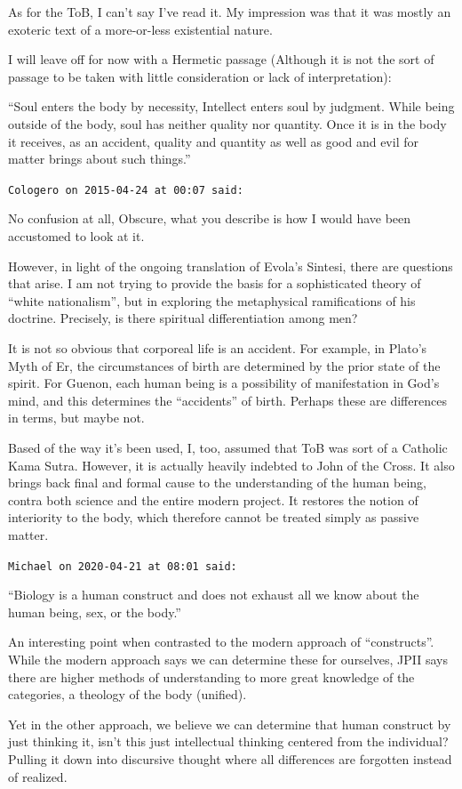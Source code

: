 \begin{footnotesize}
\begin{sffamily}
As for the ToB, I can't say I've read it. My impression was that it was mostly an exoteric text of a more-or-less existential nature.

I will leave off for now with a Hermetic passage (Although it is not the sort of passage to be taken with little consideration or lack of interpretation):

``Soul enters the body by necessity, Intellect enters soul by judgment. While being outside of the body, soul has neither quality nor quantity. Once it is in the body it receives, as an accident, quality and quantity as well as good and evil for matter brings about such things.''

\hfill

\texttt{Cologero on 2015-04-24 at 00:07 said:}

No confusion at all, Obscure, what you describe is how I would have been accustomed to look at it.

However, in light of the ongoing translation of Evola's Sintesi, there are questions that arise. I am not trying to provide the basis for a sophisticated theory of ``white nationalism'', but in exploring the metaphysical ramifications of his doctrine. Precisely, is there spiritual differentiation among men?

It is not so obvious that corporeal life is an accident. For example, in Plato's Myth of Er, the circumstances of birth are determined by the prior state of the spirit. For Guenon, each human being is a possibility of manifestation in God's mind, and this determines the ``accidents'' of birth. Perhaps these are differences in terms, but maybe not.

Based of the way it's been used, I, too, assumed that ToB was sort of a Catholic Kama Sutra. However, it is actually heavily indebted to John of the Cross. It also brings back final and formal cause to the understanding of the human being, contra both science and the entire modern project. It restores the notion of interiority to the body, which therefore cannot be treated simply as passive matter.

\hfill

\texttt{Michael on 2020-04-21 at 08:01 said:}

``Biology is a human construct and does not exhaust all we know about the human being, sex, or the body.''

An interesting point when contrasted to the modern approach of ``constructs''. While the modern approach says we can determine these for ourselves, JPII says there are higher methods of understanding to more great knowledge of the categories, a theology of the body (unified).

Yet in the other approach, we believe we can determine that human construct by just thinking it, isn't this just intellectual thinking centered from the individual? Pulling it down into discursive thought where all differences are forgotten instead of realized.

\end{sffamily}
\end{footnotesize}

